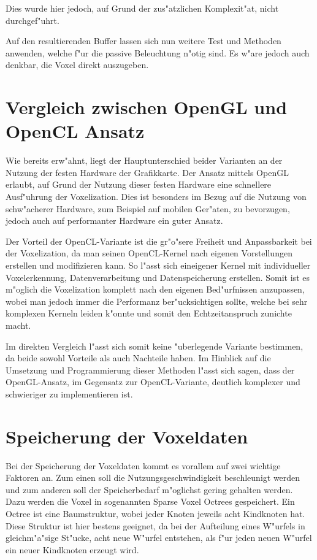 \documentclass[a4paper, 12pt]{scrartcl}
\begin{document}
Dies wurde hier jedoch, auf Grund der zus"atzlichen Komplexit"at, nicht durchgef"uhrt.

Auf den resultierenden Buffer lassen sich nun weitere Test und Methoden anwenden, welche f"ur die passive Beleuchtung n"otig sind. Es w"are jedoch auch denkbar, die Voxel direkt auszugeben.

\newpage

\section{Vergleich zwischen OpenGL und OpenCL Ansatz}
Wie bereits erw"ahnt, liegt der Hauptunterschied beider Varianten an der Nutzung der festen Hardware der Grafikkarte. 
Der Ansatz mittels OpenGL erlaubt, auf Grund der Nutzung dieser festen Hardware eine schnellere Ausf"uhrung der Voxelization.
Dies ist besonders im Bezug auf die Nutzung von schw"acherer Hardware, zum Beispiel auf mobilen Ger"aten, zu bevorzugen, jedoch auch auf performanter Hardware ein guter Ansatz.

Der Vorteil der OpenCL-Variante ist die gr"o"sere Freiheit und Anpassbarkeit bei der Voxelization, da man seinen OpenCL-Kernel nach eigenen Vorstellungen erstellen und modifizieren kann.
So l"asst sich eineigener Kernel mit individueller Voxelerkennung, Datenverarbeitung und Datenspeicherung erstellen. 
Somit ist es m"oglich die Voxelization komplett nach den eigenen Bed"urfnissen anzupassen, wobei man jedoch immer die Performanz ber"ucksichtigen sollte, welche bei sehr komplexen Kerneln leiden k"onnte und somit den Echtzeitanspruch zunichte macht.

Im direkten Vergleich l"asst sich somit keine "uberlegende Variante bestimmen, da beide sowohl Vorteile als auch Nachteile haben. 
Im Hinblick auf die Umsetzung und Programmierung dieser Methoden l"asst sich sagen, dass der OpenGL-Ansatz, im Gegensatz zur OpenCL-Variante, deutlich komplexer und schwieriger zu implementieren ist.



\section{Speicherung der Voxeldaten}
Bei der Speicherung der Voxeldaten kommt es vorallem auf zwei wichtige Faktoren an.
Zum einen soll die Nutzungsgeschwindigkeit beschleunigt werden und zum anderen soll der Speicherbedarf m"oglichst gering gehalten werden.
Dazu werden die Voxel in sogenannten Sparse Voxel Octrees gespeichert. 
Ein Octree ist eine Baumstruktur, wobei jeder Knoten jeweils acht Kindknoten hat. Diese Struktur ist hier bestens geeignet, da bei der Aufteilung eines W"urfels in gleichm"a"sige St"ucke, acht neue W"urfel entstehen, als f"ur jeden neuen W"urfel ein neuer Kindknoten erzeugt wird.
\end{document}
